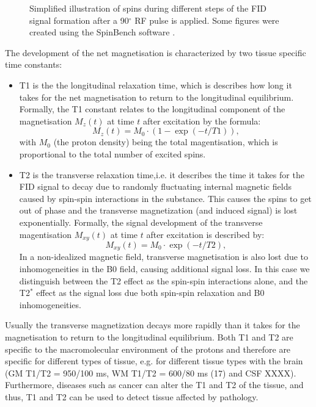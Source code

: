 \begin{figure}[H]
\centering
{}
\caption{Simplified illustration of spins during different steps of the FID signal formation after a 90$^\circ$ RF pulse is applied. Some figures were created using the SpinBench software \citep{Overall:2007}.}
\label{fig:chapter2 spin FIDs}
\end{figure}

The development of the net magnetisation is characterized by two tissue specific time constants:  
\begin{itemize}
	\item T1 is the the longitudinal relaxation time, which is describes how long it takes for the net magnetisation to return to the longitudinal equilibrium. Formally, the T1 constant relates to the longitudinal component of the magnetisation $M_z(t)$ at time $t$ after excitation by the formula:
	\begin{equation}
		M_z(t) = M_0 \cdot (1-\exp(-t/T1)),
	\end{equation} 
	with $M_0$ (the proton density) being the total magentisation, which is proportional to the total number of excited spins. 
	\item T2 is the transverse relaxation time,i.e. it describes the time it takes for the FID signal to decay due to randomly fluctuating internal magnetic fields caused by spin-spin interactions in the substance. This causes the spins to get out of phase and the transverse magnetization (and induced signal) is lost exponentially. Formally, the signal development of the transverse magentisation $M_{xy}(t)$ at time $t$ after excitation is described by:
	\begin{equation}
		M_{xy}(t) = M_0 \cdot \exp(-t/T2),
	\end{equation} 	
	In a non-idealized magnetic field, transverse magnetisation is also lost due to inhomogeneities in the B0 field, causing additional signal loss. In this case we distinguish between the T2 effect as the spin-spin interactions alone, and the T2$^*$ effect as the signal loss due both spin-spin relaxation and B0 inhomogeneities.
\end{itemize}

Usually the transverse magnetization decays more rapidly than it takes for the magnetisation to return to the longitudinal equilibrium. Both T1 and T2 are specific to the macromolecular environment of the protons and therefore are specific for different types of tissue, e.g. for different tissue types with the brain (GM T1/T2 = 950/100 ms, WM T1/T2 = 600/80 ms (17) and CSF XXXX). Furthermore, diseases such as cancer can alter the T1 and T2 of the tissue, and thus, T1 and T2 can be used to detect tissue affected by pathology.
